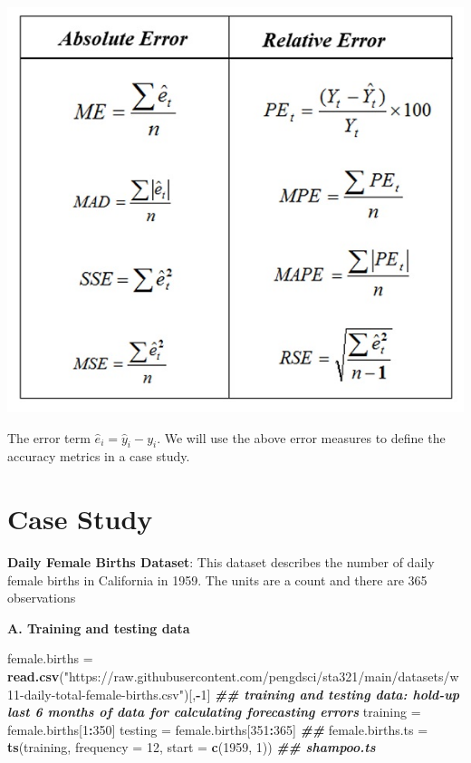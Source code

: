 \documentclass[
]{book}
\newenvironment{Shaded}{\begin{snugshade}}{\end{snugshade}}
\newcommand{\AttributeTok}[1]{\textcolor[rgb]{0.13,0.29,0.53}{#1}}
\newcommand{\DecValTok}[1]{\textcolor[rgb]{0.00,0.00,0.81}{#1}}
\newcommand{\DocumentationTok}[1]{\textcolor[rgb]{0.56,0.35,0.01}{\textbf{\textit{#1}}}}
\newcommand{\FunctionTok}[1]{\textcolor[rgb]{0.13,0.29,0.53}{\textbf{#1}}}
\newcommand{\NormalTok}[1]{#1}
\newcommand{\OtherTok}[1]{\textcolor[rgb]{0.56,0.35,0.01}{#1}}
\newcommand{\SpecialCharTok}[1]{\textcolor[rgb]{0.81,0.36,0.00}{\textbf{#1}}}
\newcommand{\StringTok}[1]{\textcolor[rgb]{0.31,0.60,0.02}{#1}}
\begin{document}
\begin{center}\includegraphics[width=0.8\linewidth]{img11/w11-ErrorMetrics} \end{center}

The error term \(\hat{e}_i = \hat{y}_i - y_i\). We will use the above error measures to define the accuracy metrics in a case study.

\hypertarget{case-study-1}{%
\section{Case Study}\label{case-study-1}}

\textbf{Daily Female Births Dataset}: This dataset describes the number of daily female births in California in 1959. The units are a count and there are 365 observations

\textbf{A. Training and testing data}

\begin{Shaded}
\begin{Highlighting}[]
\NormalTok{female.births }\OtherTok{=} \FunctionTok{read.csv}\NormalTok{(}\StringTok{"https://raw.githubusercontent.com/pengdsci/sta321/main/datasets/w11{-}daily{-}total{-}female{-}births.csv"}\NormalTok{)[,}\SpecialCharTok{{-}}\DecValTok{1}\NormalTok{]}
\DocumentationTok{\#\# training and testing data: hold{-}up last 6 months of data for calculating forecasting errors}
\NormalTok{training }\OtherTok{=}\NormalTok{ female.births[}\DecValTok{1}\SpecialCharTok{:}\DecValTok{350}\NormalTok{]}
\NormalTok{testing }\OtherTok{=}\NormalTok{ female.births[}\DecValTok{351}\SpecialCharTok{:}\DecValTok{365}\NormalTok{]}
\DocumentationTok{\#\#}
\NormalTok{female.births.ts }\OtherTok{=} \FunctionTok{ts}\NormalTok{(training, }\AttributeTok{frequency =} \DecValTok{12}\NormalTok{, }\AttributeTok{start =} \FunctionTok{c}\NormalTok{(}\DecValTok{1959}\NormalTok{, }\DecValTok{1}\NormalTok{))}
\DocumentationTok{\#\# shampoo.ts}
\end{Highlighting}
\end{Shaded}
\end{document}
